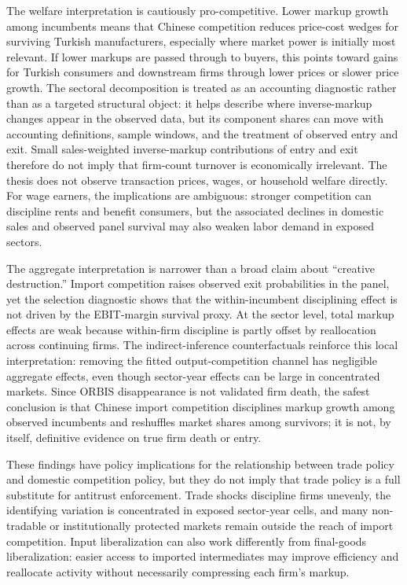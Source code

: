 ﻿\documentclass[12pt]{article}
\begin{document}
The welfare interpretation is cautiously pro-competitive. Lower markup growth among incumbents means that Chinese competition reduces price-cost wedges for surviving Turkish manufacturers, especially where market power is initially most relevant. If lower markups are passed through to buyers, this points toward gains for Turkish consumers and downstream firms through lower prices or slower price growth. The sectoral decomposition is treated as an accounting diagnostic rather than as a targeted structural object: it helps describe where inverse-markup changes appear in the observed data, but its component shares can move with accounting definitions, sample windows, and the treatment of observed entry and exit. Small sales-weighted inverse-markup contributions of entry and exit therefore do not imply that firm-count turnover is economically irrelevant. The thesis does not observe transaction prices, wages, or household welfare directly. For wage earners, the implications are ambiguous: stronger competition can discipline rents and benefit consumers, but the associated declines in domestic sales and observed panel survival may also weaken labor demand in exposed sectors.

The aggregate interpretation is narrower than a broad claim about ``creative destruction.'' Import competition raises observed exit probabilities in the panel, yet the selection diagnostic shows that the within-incumbent disciplining effect is not driven by the EBIT-margin survival proxy. At the sector level, total markup effects are weak because within-firm discipline is partly offset by reallocation across continuing firms. The indirect-inference counterfactuals reinforce this local interpretation: removing the fitted output-competition channel has negligible aggregate effects, even though sector-year effects can be large in concentrated markets. Since ORBIS disappearance is not validated firm death, the safest conclusion is that Chinese import competition disciplines markup growth among observed incumbents and reshuffles market shares among survivors; it is not, by itself, definitive evidence on true firm death or entry.

These findings have policy implications for the relationship between trade policy and domestic competition policy, but they do not imply that trade policy is a full substitute for antitrust enforcement. Trade shocks discipline firms unevenly, the identifying variation is concentrated in exposed sector-year cells, and many non-tradable or institutionally protected markets remain outside the reach of import competition. Input liberalization can also work differently from final-goods liberalization: easier access to imported intermediates may improve efficiency and reallocate activity without necessarily compressing each firm's markup.
\end{document}
